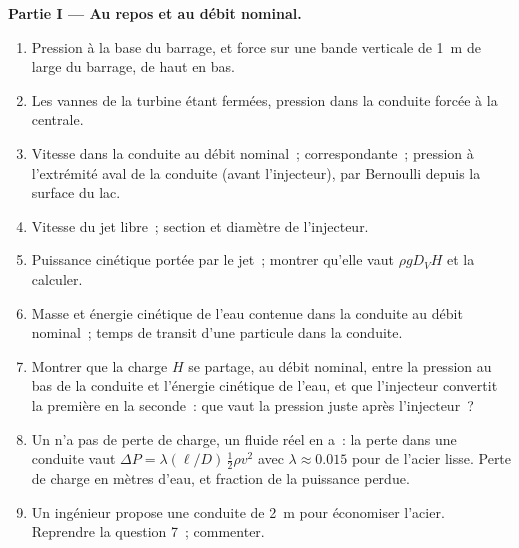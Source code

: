 \begin{problem}
\medskip
\noindent\textbf{Partie I --- Au repos et au débit nominal.}
\begin{enumerate}
  \item Pression à la base du barrage, et force sur une bande
        verticale de \qty{1}{m} de large du barrage, de haut en bas.
  \item Les vannes de la turbine étant fermées, pression dans la conduite forcée à
        la centrale.
  \item Vitesse dans la conduite au débit nominal~;  correspondante~;
        pression à l'extrémité aval de la conduite (avant
        l'injecteur), par Bernoulli depuis la surface du lac.
  \item Vitesse du jet libre~; section et diamètre de l'injecteur.
  \item Puissance cinétique portée par le jet~; montrer qu'elle vaut $\rho gD_VH$
        et la calculer.
  \item Masse et énergie cinétique de l'eau contenue dans la conduite
        au débit nominal~; temps de transit d'une particule dans la conduite.
  \item Montrer que la charge $H$ se partage, au débit nominal, entre la
        pression au bas de la conduite et l'énergie cinétique
        de l'eau, et que l'injecteur convertit la première en la
        seconde~: que vaut la pression juste après l'injecteur~?
  \item Un  n'a pas de perte de charge, un fluide réel en a~: la perte dans
        une conduite vaut $\Delta P = \lambda(\ell/D)\,\tfrac12\rho v^2$ avec $\lambda
        \approx 0.015$ pour de l'acier lisse. Perte de charge en mètres d'eau, et
        fraction de la puissance perdue.
  \item Un ingénieur propose une conduite de \qty{2}{m} pour économiser l'acier. Reprendre
        la question 7~; commenter.
\end{enumerate}


\end{problem}
